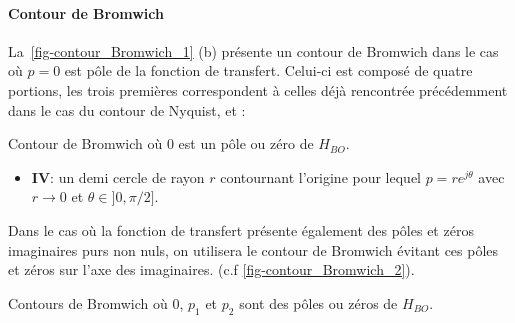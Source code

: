 \paragraph{Contour de Bromwich}
La~\cref{fig-contour_Bromwich_1} (b) présente un contour de Bromwich dans le 
cas où $p=0$ est pôle de la fonction de transfert. Celui-ci est composé de 
quatre portions, les trois premières correspondent à celles déjà 
rencontrée précédemment dans le cas du contour de Nyquist, et :
\begin{marginfigure}
    \centering
    
    \caption{Contour de Bromwich où 0 est un pôle ou zéro 
             de $H_{BO}$.\label{fig-contour_Bromwich_1}} 
\end{marginfigure}
\begin{itemize}
    \item \textbf{IV}:  un demi cercle de rayon $r$ contournant l'origine 
          pour lequel $p=re^{j\theta}$ avec $r\rightarrow0$ et 
          $\theta\in]0,\pi/2]$.
\end{itemize}
Dans le cas où la fonction de transfert présente également 
des pôles et zéros imaginaires purs non nuls, on utilisera le contour 
de Bromwich évitant ces pôles et zéros sur l'axe des imaginaires. 
(c.f \cref{fig-contour_Bromwich_2}).
\begin{marginfigure}
    \centering
    \caption{Contours de Bromwich où 0, $p_1$ et $p_2$ sont des pôles
             ou zéros de $H_{BO}$.\label{fig-contour_Bromwich_2}} 
\end{marginfigure}
\clearpage
\restoregeometry
\captionsetup{width=0.9\linewidth}
